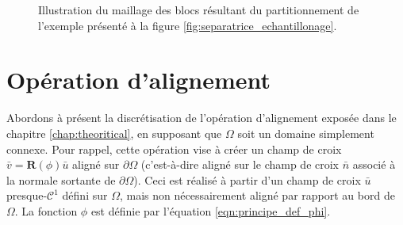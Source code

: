 \begin{figure}[h!]
\begin{subfigure}{0.49\textwidth}
    \label{fig:quad_carre}
\end{subfigure}
\caption{Illustration du maillage des blocs résultant du partitionnement de l'exemple présenté à la figure \ref{fig:separatrice_echantillonage}.}
\label{fig:maillage_quad_carre}
\end{figure}


\section{Opération d'alignement}

Abordons à présent la discrétisation de l'opération d'alignement exposée dans le chapitre \ref{chap:theoritical}, en supposant que $\Omega$ soit un domaine simplement connexe. Pour rappel, cette opération vise à créer un champ de croix $\bar{v}=\mathbf{R}(\phi)\bar{u}$ aligné sur $\partial\Omega$ (c'est-à-dire aligné sur le champ de croix $\bar{n}$ associé à la normale sortante de $\partial\Omega$). Ceci est réalisé à partir d'un champ de croix $\bar{u}$ presque-$\mathcal{C}^1$ défini sur $\Omega$, mais non nécessairement aligné par rapport au bord de $\Omega$. La fonction $\phi$ est définie par l'équation \eqref{eqn:principe_def_phi}.

